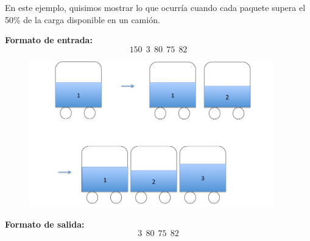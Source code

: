 \begin{itemize}
En este ejemplo, quisimos mostrar lo que ocurría cuando cada paquete supera el 50\% de la carga disponible en un camión.\newline

\textbf{Formato de entrada:} 
$$150\ \ 3\ \ 80\ \ 75\ \ 82$$

\begin{figure}[H] %
\begin{center}
\includegraphics[width=300pt]{../imgs/ejemplo2.jpg}
\end{center}
\end{figure}

\textbf{Formato de salida:}
$$3\ \ 80\ \ 75\ \ 82$$


\end{itemize}
